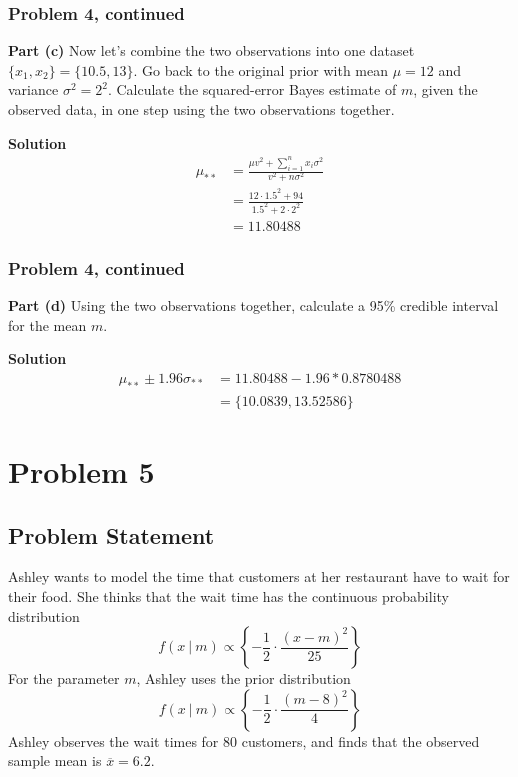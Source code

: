 \documentclass[12pt]{article}
\theoremstyle{definition}
\begin{document}
\newpage
\subsubsection*{Problem 4, continued}

\noindent
{\bf Part (c)} Now let's combine the two observations into one dataset $\{x_1, x_2\} = \{10.5, 13\}$. Go back to the original prior with mean $\mu = 12$ and variance $\sigma^2 = 2^2$. Calculate the squared-error Bayes estimate of $m$, given the observed data, in one step using the two observations together.

\bigskip
\noindent
{\bf Solution} 
\begin{align*}
\mu_{**} &= \frac{\mu v^2 + \sum_{i=1}^n x_i \sigma^2}{v^2 + n\sigma^2}\\
&= \frac{12 \cdot 1.5^2 + 94}{1.5^2 + 2 \cdot 2^2}\\
&= 11.80488
\end{align*}

\newpage
\subsubsection*{Problem 4, continued}

\noindent
{\bf Part (d)} Using the two observations together, calculate a 95\% credible interval for the mean $m$.

\bigskip
\noindent
{\bf Solution} 
\begin{align*}
\mu_{**} \pm 1.96\sigma_{**} &= 11.80488 - 1.96 * 0.8780488\\
&= \{10.0839, 13.52586\}
\end{align*}


\newpage
\section*{Problem 5}

\subsection*{Problem Statement}

Ashley wants to model the time that customers at her restaurant have to wait for their food. She thinks that the wait time has the continuous probability distribution
$$
f(x\ |\ m) \propto \left \{ - \frac{1}{2} \cdot \frac{ (x - m)^2}{25} \right \}
$$
For the parameter $m$, Ashley uses the prior distribution
$$
f(x\ |\ m) \propto \left \{ - \frac{1}{2} \cdot \frac{ (m - 8)^2}{4} \right \}
$$
Ashley observes the wait times for 80 customers, and finds that the observed sample mean is $\overline{x} = 6.2$.
\end{document}
